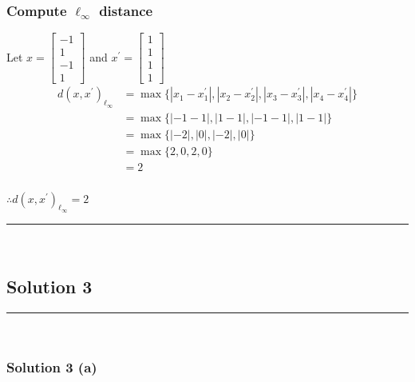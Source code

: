 \documentclass{article}
\begin{document}
\subsubsection*{Compute $\ell_{\infty}$ distance}
\parbox{\textwidth}{
Let $x = \begin{bmatrix} -1 \\ 1 \\ -1 \\ 1 \end{bmatrix}$ and $x^{\prime}=\begin{bmatrix} 1 \\ 1 \\ 1 \\ 1 \end{bmatrix}$
\begin{align*}
    d(x, x^{\prime})_{\ell_\infty} &= \max\{|x_1 - x_1^{\prime}|, |x_2 - x_2^{\prime}|, |x_3 - x_3^{\prime}|, |x_4 - x_4^{\prime}|\} \\
    &= \max\{|-1 - 1|, |1 - 1|, |-1 - 1|, |1 - 1|\} \\
    &= \max\{|-2|, |0|, |-2|, |0|\} \\
    &= \max\{2, 0, 2, 0\} \\
    &= 2
\end{align*}
}
\subsubsection*{\normalfont}{$\therefore d(x, x^{\prime})_{\ell_\infty} = 2$}

\noindent\rule{\textwidth}{0.4pt}\\

\newpage

\subsection*{Solution 3}
\noindent\rule{\textwidth}{0.4pt}\\
\subsubsection*{Solution 3 (a)}
\end{document}
